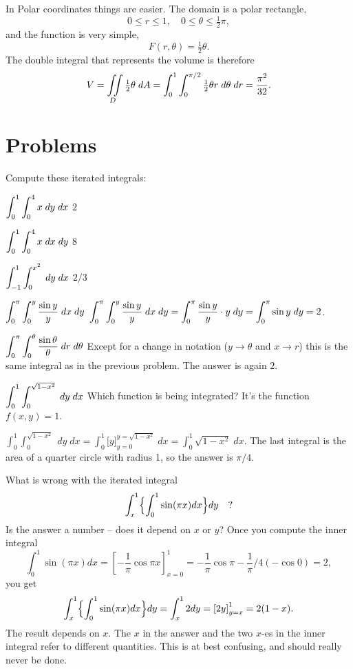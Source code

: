 In Polar coordinates things are easier.  The domain is a polar rectangle, 
\[
0\le r\le 1, \quad 0\le \theta \le \tfrac12\pi,
\]
and the function is very simple,
\[
F(r, \theta) = \tfrac12 \theta.
\]
The double integral that represents the volume is therefore
\begin{equation*}
  V  = \iint\limits_D \tfrac12\theta \; dA 
  = \int_0^1 \int_0^{\pi/2} \tfrac12 \theta r\; d\theta\; dr 
  = \frac{\pi^2}{32}.
\end{equation*}


\section{Problems} 

\problemfont\noindent
\begin{minipage}{0.44\textwidth}
\problem Compute these iterated integrals: 

\subprob $\displaystyle \int_0^1 \int_0^4 x\;  dy\;  dx$ 
\answer %
$2$
\endanswer

\subprob $\displaystyle \int_0^1 \int_0^4 x \; dx\;  dy$ 
\answer %
$8$
\endanswer 

\subprob $\displaystyle \int_{-1}^1 \int_0^{x^2} \; dy \; dx$ 
\answer
$2/3$
\endanswer
\end{minipage}\hfill
\begin{minipage}{0.44\textwidth}
\subprob $\displaystyle \int_0^\pi \int _0^y \frac{\sin y}{y}\; dx\; dy$ 
\answer
$\displaystyle \int_0^\pi \int _0^y \frac{\sin y}{y}\; dx\; dy
=
\int_0^\pi \frac{\sin y}{y} \cdot y \; dy = \int_0^\pi \sin y \; dy =
2$.
\endanswer

\subprob $\displaystyle \int_0^\pi \int _0^\theta \frac{\sin \theta}{\theta}\;dr\; d\theta$ 
\answer
Except for a change in notation ($y\to\theta$ and $x\to r$) this is
the same integral as in the previous problem.  The answer is again $2$.
\endanswer

\subprob $\displaystyle \int_0^1 \int _0^{\sqrt{1-x^2}}\; dy\; dx$ 
\answer
Which function is being integrated?  It's the function $f(x, y) = 1$.

\noindent
$\int_0^1 \int _0^{\sqrt{1-x^2}}\; dy\; dx
=\int_0^1 \bigl[y\bigr]_{y=0}^{y=\sqrt{1-x^2}}\; dx
= \int_0^1 \sqrt{1-x^2}\; dx$.
The last integral
is the area of a quarter circle with radius 1, so the answer is $\pi/4$.
\endanswer
\end{minipage}

\problem What is wrong with the iterated integral 
\[
\int_x^1 \Bigl\{\int_0^1 \sin(\pi x) dx \Bigr\}dy\quad ?
\] 
Is the answer a number -- does it depend on $x$ or $y$?
\answer
Once you compute the inner integral
\[
\int_0^1 \sin(\pi x) dx  = \left[ -\frac1\pi\cos\pi x \right]_{x=0}^1
=-\frac1\pi\cos \pi - \frac1\pi/4 (-\cos 0) = 2,
\]
you get 
\[
\int_x^1 \Bigl\{\int_0^1 \sin(\pi x) dx \Bigr\}dy
=\int_x^1 2dy = \left[ 2y \right]_{y=x}^1 = 2(1-x).
\]
The result depends on $x$.  The $x$ in the answer and the two $x$-es
in the inner integral refer to different quantities.  This is at best
confusing, and should really never be done.
\endanswer

